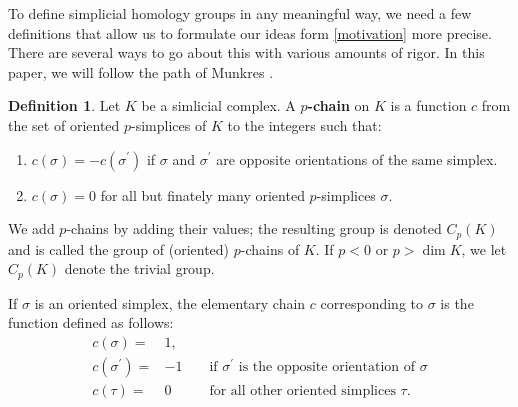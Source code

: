 \documentclass[draft]{scrartcl}
\theoremstyle{plain}
\theoremstyle{definition}
\newtheorem	{definition}[theorem]{Definition}
\theoremstyle{remark}
\begin{document}
%
%
%
%
%
%

To define simplicial homology groups in any meaningful way, we need a few definitions that allow us to formulate our ideas form \autoref{motivation} more precise. There are several ways to go about this with various amounts of rigor. In this paper, we will follow the path of Munkres \cite[p. 27f]{mu}.

\begin{definition}
	Let $K$ be a simlicial complex. A \textbf{$p$-chain} on $K$ is a function $c$ from the set of oriented $p$-simplices of $K$ to the integers such that:
	\begin{enumerate}
		\item $c(\sigma)=-c(\sigma^\prime)$ if $\sigma$ and $\sigma^\prime$ are opposite orientations of the same simplex.
		\item $c(\sigma)=0$ for all but finately many oriented $p$-simplices $\sigma$.
	\end{enumerate}
We add $p$-chains by adding their values; the resulting group is denoted $C_p(K)$ and is called the group of (oriented) $p$-chains of $K$. If $p<0$ or $p>\dim K$, we let $C_p(K)$ denote the trivial group.

If $\sigma$ is an oriented simplex, the elementary chain $c$ corresponding to $\sigma$ is the function defined as follows:
\begin{align*}c(\sigma)=&1,\\
 c(\sigma^\prime)=&-1&&\text{ if $\sigma^\prime$ is the opposite orientation of $\sigma$}\\
 c(\tau)=&0 &&\text{ for all other oriented simplices $\tau$.} 
 \end{align*}
\end{definition}
\end{document}
